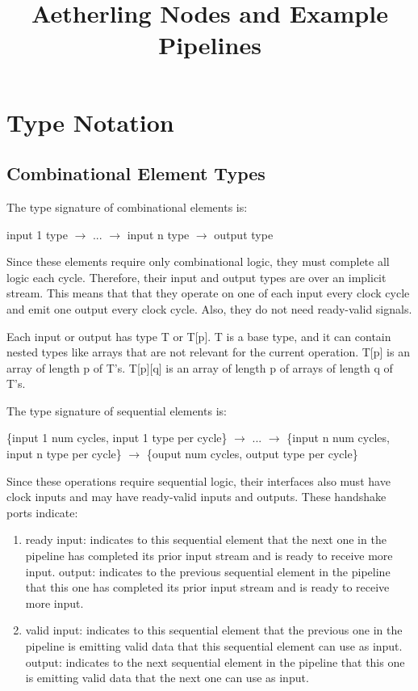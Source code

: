 \documentclass[11pt,fleqn]{article}
\numberwithin{equation}{subsection}
\begin{document}
\title{Aetherling Nodes and Example Pipelines}

\section{Type Notation}

\subsection{Combinational Element Types}
The type signature of combinational elements is:
\begin{adjustwidth}{2.5 em}{0 pt}
    input 1 type $\rightarrow$ ... $\rightarrow$ input n type $\rightarrow$ output type
\end{adjustwidth}
Since these elements require only combinational logic, they must complete all
logic each cycle. Therefore, their input and output types are over
an implicit stream. This means that that they operate on one of each input every 
clock cycle and emit one output every clock cycle. Also, they do not need
ready-valid signals.

Each input or output has type T or T[p]. T is a base type, and it can contain 
nested types like arrays that are not relevant for the current operation. T[p] 
is an array of length p of T's. T[p][q] is an array of length p of arrays of 
length q of T's.

The type signature of sequential elements is:
\begin{adjustwidth}{2.5 em}{0 pt}
    \{input 1 num cycles, input 1 type per cycle\} $\rightarrow$ ...
    $\rightarrow$ \{input n num cycles, input n type per cycle\} $\rightarrow$
    \{ouput num cycles, output type per cycle\}
\end{adjustwidth}
Since these operations require sequential logic, their interfaces also must have
clock inputs and may have ready-valid inputs and outputs. These handshake ports
indicate:
\begin{enumerate}
        \item ready
            \subitem input: indicates to this sequential element that the next 
            one in the pipeline has completed its prior input stream and is 
            ready to receive more input.
            \subitem output: indicates to the previous sequential element in the 
            pipeline that this one has completed its prior input stream and is
            ready to receive more input.
        \item valid
            \subitem input: indicates to this sequential element that the previous
            one in the pipeline is emitting valid data that this sequential 
            element can use as input.
            \subitem output: indicates to the next sequential element in the
            pipeline that this one is emitting valid data that the next one
            can use as input.
\end{enumerate}
\end{document}

